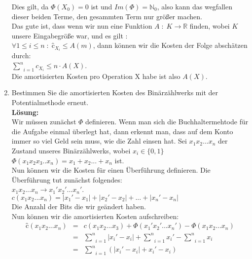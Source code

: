 \documentclass[11pt,a4paper,ngerman]{article}
\begin{document}
\begin{enumerate}[\bfseries (a)]
Dies gilt, da $\Phi (X_0) = 0$ ist und $Im(\Phi) = \mathbb{N}_0$, also kann das wegfallen dieser beiden Terme, den gesammten Term nur größer machen.\\

Das gute ist, dass wenn wir nun eine Funktion $A \; : \; K \rightarrow \mathbb{R}$ finden, wobei $K$ unsere Eingabegröße war, und es gilt :\\
$\forall 1 \leq i \leq n \; : \; \text{\^{c}}_{X_i} \leq A(m)$, dann können wir die Kosten der Folge abschätzen durch:\\
$\underset{i=1}{\overset{n}{\sum}} c_{X_i} \leq n \cdot A(X)$.\\

Die amortisierten Kosten pro Operation X habe ist also $A(X)$. 

\item Bestimmen Sie die amortisierten Kosten des Binärzählwerks mit der Potentialmethode erneut.\\

\textbf{Lösung:}\\

Wir müssen zunächst $\Phi$ definieren. Wenn man sich die Buchhaltermehtode für die Aufgabe einmal überlegt hat, dann erkennt man, dass auf dem Konto immer so viel Geld sein muss, wie die Zahl einsen hat. Sei $x_1x_2...x_n$ der Zustand unseres Binärzählwerks, wobei $x_i\in\{ 0 , 1 \}$
$\Phi(x_1x_2x_3 .. x_n ) = x_1 + x_2 ... + x_n$ ist.\\

Nun können wir die Kosten für einen Überführung definieren. Die Überführung tut zunächst folgendes:\\
$ x_1x_2...x_n \rightarrow x_1'x_2' ... x_n'$.\\
$c(x_1x_2...x_n) = |x_1' - x_1| + | x_2' - x_2| + ... + | x_n' - x_n|$\\
Die Anzahl der Bits die wir geändert haben.\\

Nun können wir die amortisierten Kosten aufschreiben:\\
$$
\begin{array}{rcl}
\text{\^{c}}(x_1x_2 ... x_n) &=& c(x_1x_2...x_3) + \Phi(x_1'x_2'...x_n') -\Phi(x_1x_2...x_n)\\
&=& \underset{i=1}{\overset{n}{\sum}} | x_i' - x_i| + \underset{i=1}{\overset{n}{\sum}} x_i' - \underset{i=1}{\overset{n}{\sum}} x_i\\
&=& \underset{i=1}{\overset{n}{\sum}} \left( | x_i' - x_i| +  x_i' - x_i \right) 
\end{array}
$$


\end{enumerate}
\end{document}
